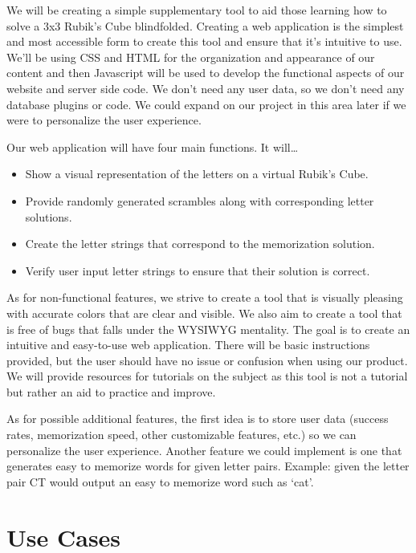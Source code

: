 \documentclass[12pt]{article}
\begin{document}
\par
We will be creating a simple supplementary tool to aid those learning how to solve a 3x3 Rubik’s Cube blindfolded. Creating a web application is the simplest and most accessible form to create this tool and ensure that it’s intuitive to use. We’ll be using CSS and HTML for the organization and appearance of our content and then Javascript will be used to develop the functional aspects of our website and server side code. We don’t need any user data, so we don’t need any database plugins or code. We could expand on our project in this area later if we were to personalize the user experience. \\
\par
Our web application will have four main functions. It will…
\begin{itemize}
\item Show a visual representation of the letters on a virtual Rubik’s Cube.
\item Provide randomly generated scrambles along with corresponding letter solutions.
\item Create the letter strings that correspond to the memorization solution. 
\item Verify user input letter strings to ensure that their solution is correct. 
\end{itemize}
\par
As for non-functional features, we strive to create a tool that is visually pleasing with accurate colors that are clear and visible. We also aim to create a tool that is free of bugs that falls under the WYSIWYG mentality. The goal is to create an intuitive and easy-to-use web application. There will be basic instructions provided, but the user should have no issue or confusion when using our product. We will provide resources for tutorials on the subject as this tool is not a tutorial but rather an aid to practice and improve. \\

\par
As for possible additional features, the first idea is to store user data (success rates, memorization speed, other customizable features, etc.) so we can personalize the user experience. Another feature we could implement is one that generates easy to memorize words for given letter pairs. Example: given the letter pair CT would output an easy to memorize word such as ‘cat’. \\

\section{Use Cases}
\end{document}
